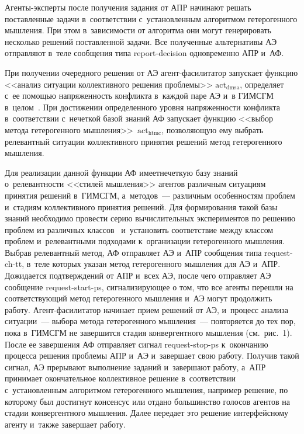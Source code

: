 \begin{multicols}{2}

\noindent
 Агенты-экс\-пер\-ты после 
получения задания от АПР начинают решать поставленные задачи 
в~соответствии с~установленным алгоритмом гетерогенного мышления. При 
этом в~за\-ви\-си\-мости от алгоритма они могут генерировать несколько решений 
по\-став\-лен\-ной задачи. Все полученные альтернативы АЭ отправляют в~теле 
сообщения типа report-decision одновременно АПР и~АФ. 
  
  При получении очередного решения от АЭ агент-фа\-си\-ли\-та\-тор 
запускает функцию <<анализ ситуации коллективного решения проблемы>> 
$\mathrm{act}_{\mathrm{dmsa}}$, определяет с~ее помощью напряженность конфликта в~каждой 
паре АЭ и~в ГИМСГМ в~целом~\cite{4-kol}. При достижении определенного 
уровня напряженности конфликта в~соответствии с~нечеткой базой знаний АФ 
запускает функцию <<выбор метода гетерогенного мышления>>~$\mathrm{act}_{\mathrm{htmc}}$, 
позволяющую ему выбрать релевантный ситуации коллективного принятия 
решений метод гетерогенного мышления. 

Для реализации данной функции АФ 
имеет\linebreak нечеткую базу знаний о~релевантности <<стилей мышления>> агентов 
различным ситуациям принятия решений в~ГИМСГМ, а~методов~--- 
различным особенностям проблем и~стадиям коллективного принятия решений. 
Для формирования такой базы знаний необходимо провести серию 
вычислительных экспериментов по решению проблем из различных 
классов~\cite{5-kol} и~установить соответствие между классом проблем 
и~релевантными подходами к~организации гетерогенного мышления. Выбрав 
релевантный метод, АФ отправляет АЭ и~АПР сообщения типа request-ch-tt, 
в~теле которых указан метод гетерогенного мышления для АЭ и~АПР. 
Дожидается подтверждений от АПР и~всех АЭ, после чего отправляет АЭ 
сообщение request-start-ps, сигнализирующее о том, что все агенты перешли на 
соответствующий метод гетерогенного мышления и~АЭ могут продолжить 
работу. Агент-фа\-си\-ли\-та\-тор начинает прием решений от АЭ,
 и~процесс анализа ситуации~--- 
выбора метода гетерогенного мышления~--- повторяется до тех пор, пока 
в~\mbox{ГИМСГМ} не завершится стадия конвергентного мышления (см.\ рис.~1). После 
ее завершения АФ отправляет сигнал request-stop-ps к~окончанию процесса 
решения проблемы АПР и~АЭ и~завершает свою работу. Получив такой сигнал, 
АЭ прерывают выполнение заданий и~завершают работу, а~АПР принимает 
окончательное коллективное решение в~соответствии с~уста\-нов\-лен\-ным 
алгоритмом гетерогенного мыш\-ле\-ния, например решение, по которому был 
достигнут консенсус или отдано большинство голосов агентов на стадии 
конвергентного мыш\-ле\-ния. Далее передает это решение интерфейсному 
агенту и~так\-же завершает работу.
  

\end{multicols}

